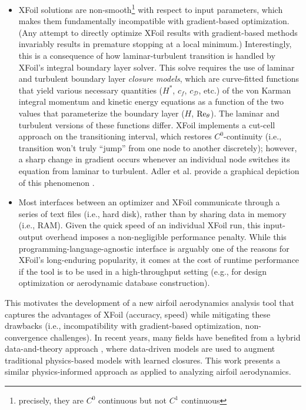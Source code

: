 \documentclass[journal]{new-aiaa}
\begin{document}
\begin{itemize}
    \item XFoil solutions are non-smooth\footnote{precisely, they are $C^0$ continuous but not $C^1$ continuous} with respect to input parameters, which makes them fundamentally incompatible with gradient-based optimization. (Any attempt to directly optimize XFoil results with gradient-based methods invariably results in premature stopping at a local minimum.) Interestingly, this is a consequence of how laminar-turbulent transition is handled by XFoil's integral boundary layer solver. This solve requires the use of laminar and turbulent boundary layer \emph{closure models}, which are curve-fitted functions that yield various necessary quantities ($H^*$, $c_f$, $c_\mathcal{D}$, etc.) of the von Karman integral momentum and kinetic energy equations as a function of the two values that parameterize the boundary layer ($H$, $\rm Re_\theta$). The laminar and turbulent versions of these functions differ. XFoil implements a cut-cell approach on the transitioning interval, which restores $C^0$-continuity (i.e., transition won't truly ``jump'' from one node to another discretely); however, a sharp change in gradient occurs whenever an individual node switches its equation from laminar to turbulent. Adler et al. provide a graphical depiction of this phenomenon \cite{adlerCFDNotCFD2022}.
    \item Most interfaces between an optimizer and XFoil communicate through a series of text files (i.e., hard disk), rather than by sharing data in memory (i.e., RAM). Given the quick speed of an individual XFoil run, this input-output overhead imposes a non-negligible performance penalty. While this programming-language-agnostic interface is arguably one of the reasons for XFoil's long-enduring popularity, it comes at the cost of runtime performance if the tool is to be used in a high-throughput setting (e.g., for design optimization or aerodynamic database construction).
\end{itemize}

This motivates the development of a new airfoil aerodynamics analysis tool that captures the advantages of XFoil (accuracy, speed) while mitigating these drawbacks (i.e., incompatibility with gradient-based optimization, non-convergence challenges). In recent years, many fields have benefited from a hybrid data-and-theory approach \cite{bruntonDataDrivenScience2017}, where data-driven models are used to augment traditional physics-based models with learned closures. This work presents a similar physics-informed approach as applied to analyzing airfoil aerodynamics.
\end{document}
